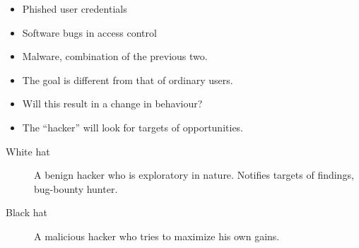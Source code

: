 \begin{frame}
  \begin{example}
    \begin{itemize}
      \item Phished user credentials
      \item Software bugs in access control
      \item Malware, combination of the previous two.
    \end{itemize}
  \end{example}
\end{frame}

\begin{frame}
  \begin{remark}
    \begin{itemize}
      \item The goal is different from that of ordinary users.
      \item Will this result in a change in behaviour?
    \end{itemize}
  \end{remark}
\end{frame}

\begin{frame}
  \begin{example}
    \begin{itemize}
      \item The \enquote{hacker} will look for targets of opportunities.
    \end{itemize}
  \end{example}

  \begin{definition}
    \begin{description}
      \item[White hat] A benign hacker who is exploratory in nature.
        Notifies targets of findings, bug-bounty hunter.

      \item[Black hat] A malicious hacker who tries to maximize his own gains.
    \end{description}
  \end{definition}
\end{frame}

